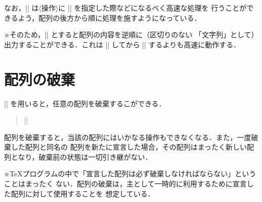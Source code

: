 \documentclass[a4paper,uplatex]{jsarticle}
\newcommand{\Meta}[1]{$\langle$\mbox{}#1\mbox{}$\rangle$}
\newcommand{\Note}{\par\noindent ※}
\newenvironment{syntax}{\begin{quote}\small}{\end{quote}}
\begin{document}
なお，|\EachArray| は\Meta{操作}に |\DeleteArray| を指定した際などになるべく高速な処理を
行うことができるよう，配列の後方から順に処理を施すようになっている．

\Note そのため，|| とすると配列の内容を逆順に（区切りのない
「文字列」として）出力することができる．これは |\ReverseArray| してから |\toStringArray| 
するよりも高速に動作する．

\section{配列の破棄}

|\DestructArray| を用いると，任意の配列を破棄するこができる．
%
\begin{syntax}
|\DestructArray{|\Meta{配列名}|}|
\end{syntax}

配列を破棄すると，当該の配列にはいかなる操作もできなくなる．また，一度破棄した配列と同名の
配列を新たに宣言した場合，その配列はまったく新しい配列となり，破棄前の状態は一切引き継がない．

\Note \TeX プログラムの中で「宣言した配列は必ず破棄しなければならない」ということはまったく
ない．配列の破棄は，主として一時的に利用するために宣言した配列に対して使用することを
想定している．
\end{document}
